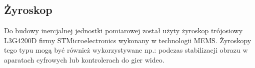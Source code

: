 \subsection{Żyroskop}
Do budowy inercjalnej jednostki pomiarowej został użyty żyroskop trójosiowy L3G4200D firmy STMicroelectronics wykonany w
technologii MEMS. Żyroskopy tego typu mogą być również wykorzystywane np.: podczas stabilizacji obrazu w aparatach cyfrowych lub
kontrolerach do gier wideo.